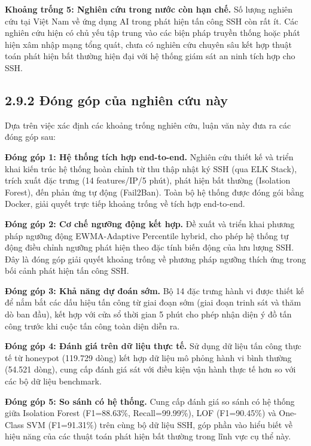 \documentclass[
  a4paper]{report}
\begin{document}
\textbf{Khoảng trống 5: Nghiên cứu trong nước còn hạn chế.} Số lượng
nghiên cứu tại Việt Nam về ứng dụng AI trong phát hiện tấn công SSH còn
rất ít. Các nghiên cứu hiện có chủ yếu tập trung vào các biện pháp
truyền thống hoặc phát hiện xâm nhập mạng tổng quát, chưa có nghiên cứu
chuyên sâu kết hợp thuật toán phát hiện bất thường hiện đại với hệ thống
giám sát an ninh tích hợp cho SSH.

\subsection{2.9.2 Đóng góp của nghiên cứu
này}\label{ux111uxf3ng-guxf3p-cux1ee7a-nghiuxean-cux1ee9u-nuxe0y}

Dựa trên việc xác định các khoảng trống nghiên cứu, luận văn này đưa ra
các đóng góp sau:

\textbf{Đóng góp 1: Hệ thống tích hợp end-to-end.} Nghiên cứu thiết kế
và triển khai kiến trúc hệ thống hoàn chỉnh từ thu thập nhật ký SSH (qua
ELK Stack), trích xuất đặc trưng (14 features/IP/5 phút), phát hiện bất
thường (Isolation Forest), đến phản ứng tự động (Fail2Ban). Toàn bộ hệ
thống được đóng gói bằng Docker, giải quyết trực tiếp khoảng trống về
tích hợp end-to-end.

\textbf{Đóng góp 2: Cơ chế ngưỡng động kết hợp.} Đề xuất và triển khai
phương pháp ngưỡng động EWMA-Adaptive Percentile hybrid, cho phép hệ
thống tự động điều chỉnh ngưỡng phát hiện theo đặc tính biến động của
lưu lượng SSH. Đây là đóng góp giải quyết khoảng trống về phương pháp
ngưỡng thích ứng trong bối cảnh phát hiện tấn công SSH.

\textbf{Đóng góp 3: Khả năng dự đoán sớm.} Bộ 14 đặc trưng hành vi được
thiết kế để nắm bắt các dấu hiệu tấn công từ giai đoạn sớm (giai đoạn
trinh sát và thăm dò ban đầu), kết hợp với cửa sổ thời gian 5 phút cho
phép nhận diện ý đồ tấn công trước khi cuộc tấn công toàn diện diễn ra.

\textbf{Đóng góp 4: Đánh giá trên dữ liệu thực tế.} Sử dụng dữ liệu tấn
công thực tế từ honeypot (119.729 dòng) kết hợp dữ liệu mô phỏng hành vi
bình thường (54.521 dòng), cung cấp đánh giá sát với điều kiện vận hành
thực tế hơn so với các bộ dữ liệu benchmark.

\textbf{Đóng góp 5: So sánh có hệ thống.} Cung cấp đánh giá so sánh có
hệ thống giữa Isolation Forest (F1=88.63\%, Recall=99.99\%), LOF
(F1=90.45\%) và One-Class SVM (F1=91.31\%) trên cùng bộ dữ liệu SSH, góp
phần vào hiểu biết về hiệu năng của các thuật toán phát hiện bất thường
trong lĩnh vực cụ thể này.
\end{document}
